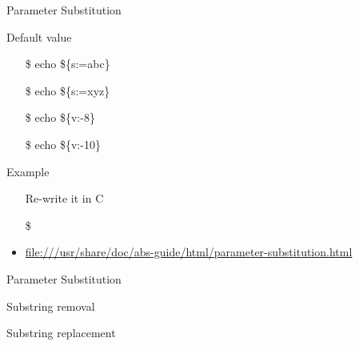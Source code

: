 \begin{frame}{Parameter Substitution}
  \begin{iblock}{Default value}\ttfamily
    \begin{multicols}{2}
      \begin{itemize}
      \item[\$] echo \$\{s:=abc\}
      \item[\$] echo \$\{s:=xyz\}
      \item[\$] echo \$\{v:-8\}
      \item[\$] echo \$\{v:-10\}
      \end{itemize}
    \end{multicols}
  \end{iblock}
  \begin{iblock}{Example}
    \begin{center}
    \end{center}
  \end{iblock}
  \begin{itemize}
  \item[\hw] Re-write it in C
  \end{itemize}
\end{frame}
\begin{itemize}
\item[\$] 
\item \url{file:///usr/share/doc/abs-guide/html/parameter-substitution.html}
\end{itemize}

\begin{frame}{Parameter Substitution}
  \begin{iblock}{Substring removal}
  \end{iblock}
  \begin{iblock}{Substring replacement}
  \end{iblock}  
\end{frame}

